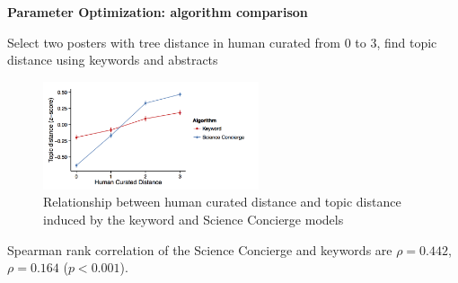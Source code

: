 \begin{frame}{\textbf{Parameter Optimization: algorithm comparison}}

Select two posters with tree distance in human curated from 0 to 3, find topic distance using keywords and abstracts

\begin{figure}
\includegraphics[width=2.5in]{images/human_vs_topic_distance}\\
\tiny{Relationship between human curated distance and topic distance induced by the keyword and Science Concierge models}
\end{figure}

Spearman rank correlation of the Science Concierge and keywords are $\rho=0.442$, $\rho=0.164$ ($p < 0.001$).

\end{frame}